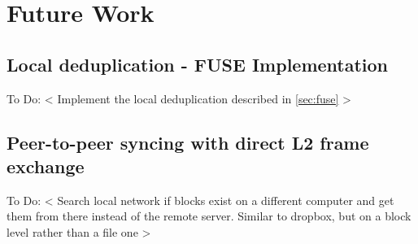 
\chapter{Future Work}
\label{cha:future-work}
\section{Local deduplication - FUSE Implementation}
To Do:
< Implement the local deduplication described in \ref{sec:fuse} >


\section{Peer-to-peer syncing with direct L2 frame exchange}
To Do:
< Search local network if blocks exist on a different computer and get them from there instead of the remote server. Similar to dropbox, but on a block level rather than a file one >
